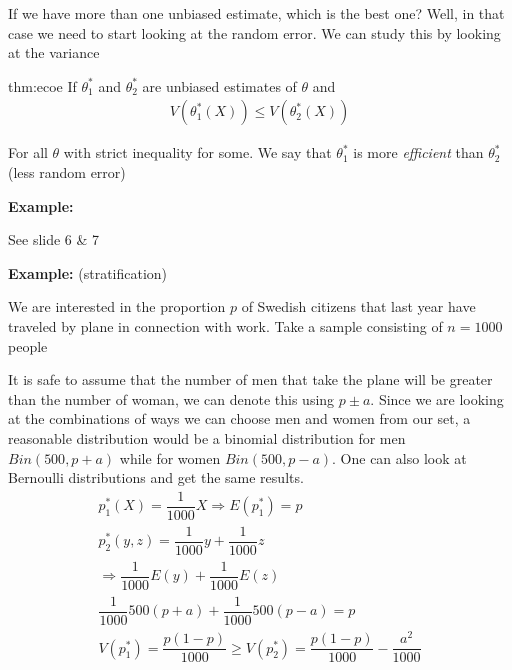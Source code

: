 \par\bigskip
\noindent If we have more than one unbiased estimate, which is the best one? Well, in that case we need to start looking at the random error. We can study this by looking at the variance
\par\bigskip
\begin{theo}{thm:ecoe}
  If $\theta_1^*$ and $\theta_2^*$ are unbiased estimates of $\theta$ and
  \begin{equation*}
    \begin{gathered}
      V(\theta_1^*(X))\leq V(\theta_2^*(X))
    \end{gathered}
  \end{equation*}
  \par\bigskip
  \noindent For all $\theta$ with strict inequality for some. We say that $\theta_1^*$ is more \textit{efficient} than $\theta_2^*$ (less random error)
\end{theo}
\par\bigskip
\noindent\textbf{Example:}\par
\noindent See slide 6 \& 7
\par\bigskip
\noindent\textbf{Example:} (stratification)\par
\noindent We are interested in the proportion $p$ of Swedish citizens that last year have traveled by plane in connection with work. Take a sample consisting of $n=1000$ people\par
\noindent It is safe to assume that the number of men that take the plane will be greater than the number of woman, we can denote this using $p\pm a$. Since we are looking at the combinations of ways we can choose men and women from our set, a reasonable distribution would be a binomial distribution for men $Bin(500,p+a)$ while for women $Bin(500,p-a)$. One can also look at Bernoulli distributions and get the same results.
\begin{equation*}
  \begin{gathered}
    p_1^*(X)  = \dfrac{1}{1000}X\Rightarrow E(p_1^*) = p\\
    p_2^*(y,z) = \dfrac{1}{1000}y+\dfrac{1}{1000}z\\
    \Rightarrow \dfrac{1}{1000}E(y)+\dfrac{1}{1000}E(z)\\
    \dfrac{1}{1000}500(p+a)+\dfrac{1}{1000}500(p-a) = p\\
    V(p_1^*) = \dfrac{p(1-p)}{1000}\geq V(p_2^*) = \dfrac{p(1-p)}{1000}-\dfrac{a^2}{1000}
  \end{gathered}
\end{equation*}
